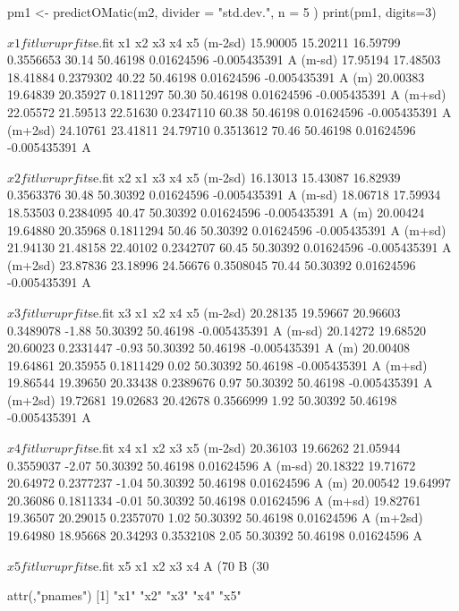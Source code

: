 \begin{Schunk}
\begin{Sinput}
 pm1 <- predictOMatic(m2, divider = "std.dev.", n = 5 )
 print(pm1, digits=3)
\end{Sinput}
\begin{Soutput}
$x1
             fit      lwr      upr fit$se.fit    x1       x2         x3           x4 x5
(m-2sd) 15.90005 15.20211 16.59799  0.3556653 30.14 50.46198 0.01624596 -0.005435391  A
(m-sd)  17.95194 17.48503 18.41884  0.2379302 40.22 50.46198 0.01624596 -0.005435391  A
(m)     20.00383 19.64839 20.35927  0.1811297 50.30 50.46198 0.01624596 -0.005435391  A
(m+sd)  22.05572 21.59513 22.51630  0.2347110 60.38 50.46198 0.01624596 -0.005435391  A
(m+2sd) 24.10761 23.41811 24.79710  0.3513612 70.46 50.46198 0.01624596 -0.005435391  A

$x2
             fit      lwr      upr fit$se.fit    x2       x1         x3           x4 x5
(m-2sd) 16.13013 15.43087 16.82939  0.3563376 30.48 50.30392 0.01624596 -0.005435391  A
(m-sd)  18.06718 17.59934 18.53503  0.2384095 40.47 50.30392 0.01624596 -0.005435391  A
(m)     20.00424 19.64880 20.35968  0.1811294 50.46 50.30392 0.01624596 -0.005435391  A
(m+sd)  21.94130 21.48158 22.40102  0.2342707 60.45 50.30392 0.01624596 -0.005435391  A
(m+2sd) 23.87836 23.18996 24.56676  0.3508045 70.44 50.30392 0.01624596 -0.005435391  A

$x3
             fit      lwr      upr fit$se.fit    x3       x1       x2           x4 x5
(m-2sd) 20.28135 19.59667 20.96603  0.3489078 -1.88 50.30392 50.46198 -0.005435391  A
(m-sd)  20.14272 19.68520 20.60023  0.2331447 -0.93 50.30392 50.46198 -0.005435391  A
(m)     20.00408 19.64861 20.35955  0.1811429  0.02 50.30392 50.46198 -0.005435391  A
(m+sd)  19.86544 19.39650 20.33438  0.2389676  0.97 50.30392 50.46198 -0.005435391  A
(m+2sd) 19.72681 19.02683 20.42678  0.3566999  1.92 50.30392 50.46198 -0.005435391  A

$x4
             fit      lwr      upr fit$se.fit    x4       x1       x2         x3 x5
(m-2sd) 20.36103 19.66262 21.05944  0.3559037 -2.07 50.30392 50.46198 0.01624596  A
(m-sd)  20.18322 19.71672 20.64972  0.2377237 -1.04 50.30392 50.46198 0.01624596  A
(m)     20.00542 19.64997 20.36086  0.1811334 -0.01 50.30392 50.46198 0.01624596  A
(m+sd)  19.82761 19.36507 20.29015  0.2357070  1.02 50.30392 50.46198 0.01624596  A
(m+2sd) 19.64980 18.95668 20.34293  0.3532108  2.05 50.30392 50.46198 0.01624596  A

$x5
             fit      lwr      upr fit$se.fit x5       x1       x2         x3           x4
A (70%) 20.00463 19.64919 20.36007  0.1811289  A 50.30392 50.46198 0.01624596 -0.005435391
B (30%) 20.07446 19.53116 20.61776  0.2768619  B 50.30392 50.46198 0.01624596 -0.005435391

attr(,"pnames")
[1] "x1" "x2" "x3" "x4" "x5"
\end{Soutput}
\end{Schunk}
